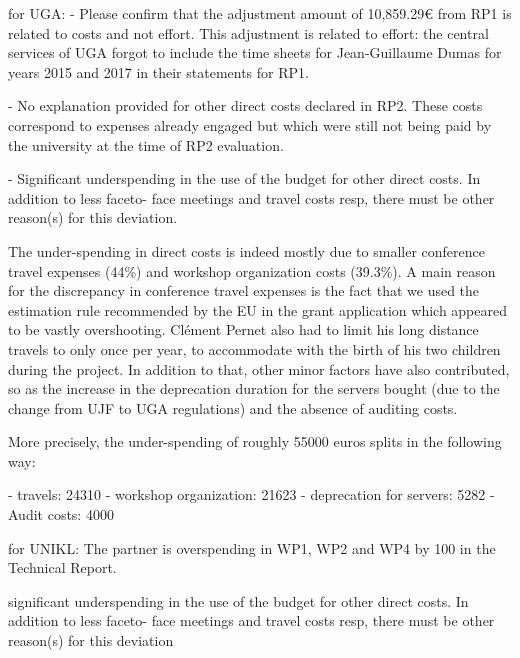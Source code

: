 for UGA: 
- Please confirm that the adjustment amount of 10,859.29€ from RP1 is related to costs and not
effort.
 This adjustment is related to effort: the central services of UGA forgot to include the time
 sheets for Jean-Guillaume Dumas for years 2015 and 2017 in their statements for RP1.

- No explanation provided for other direct costs declared in RP2.
These costs correspond to expenses already engaged but which were still not being paid by the university at
the time of RP2 evaluation.

- Significant underspending in the use of the budget for other direct costs. In addition to less faceto-
face meetings and travel costs resp, there must be other reason(s) for this deviation.

The under-spending in direct costs is indeed mostly due to smaller conference travel expenses (44\%) and workshop
organization costs (39.3\%). A main reason for the discrepancy in conference travel expenses is the
fact that we used the estimation rule recommended by the EU in the grant application which appeared
to be vastly overshooting. Cl\'ement Pernet also had to limit his long distance travels to only once
per year, to accommodate with the birth of his two children during the project.
In addition to that,
other minor factors have also contributed, so as the increase in the deprecation duration for the
servers bought (due to the change from UJF to UGA regulations) and the absence of auditing costs.

More precisely, the under-spending of roughly 55000 euros splits in the following way:

- travels: 24310
- workshop organization: 21623
- deprecation for servers: 5282
- Audit costs: 4000

for UNIKL:
The partner is overspending in WP1, WP2 and WP4 by 100%
in the Technical Report.

significant underspending in the use of the budget for other direct costs. In addition to less faceto-
face meetings and travel costs resp, there must be other reason(s) for this deviation


